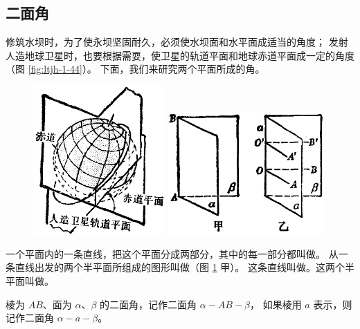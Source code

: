 \subsection{二面角}\label{subsec:1-14}

修筑水坝时，为了使永坝坚固耐久，必须使水坝面和水平面成适当的角度；
发射人造地球卫星时，也要根据需耍，使卫星的轨道平面和地球赤道平面成一定的角度（图 \ref{fig:ltjh-1-44}）。
下面，我们来研究两个平面所成的角。

\begin{figure}[htbp]
    \centering
    \begin{minipage}[b]{7cm}
        \centering
        \includegraphics[width=5cm]{../pic/ltjh-ch1-44.png}
        \caption{}\label{fig:ltjh-1-44}
    \end{minipage}
    \qquad
    \begin{minipage}[b]{7cm}
        \centering
        \includegraphics[width=6cm]{../pic/ltjh-ch1-45.png}
        \caption{}\label{fig:ltjh-1-45}
    \end{minipage}
\end{figure}

一个平面内的一条直线，把这个平面分成两部分，其中的每一部分都叫做。
从一条直线出发的两个半平面所组成的图形叫做（图 \ref{fig:ltjh-1-45} 甲）。
这条直线叫做。这两个半平面叫做。

棱为 $AB$、面为 $\alpha$、$\beta$ 的二面角，记作二面角 $\alpha{-}AB{-}\beta$，
如果棱用 $a$ 表示，则记作二面角 $\alpha{-}a{-}\beta$。

